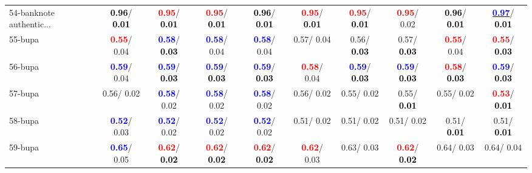 \begin{table}[h]
\begin{center}
{\begin{tabular}{lc|c|c|c|c|c|c|c|c}
54-banknote authentic... & \textcolor{black}{\textbf{  0.96}}/\textcolor{black}{\textbf{  0.01}} & \textcolor{red}{\textbf{  0.95}}/\textcolor{black}{\textbf{  0.01}} & \textcolor{red}{\textbf{  0.95}}/\textcolor{black}{\textbf{  0.01}} & \textcolor{black}{\textbf{  0.96}}/\textcolor{black}{\textbf{  0.01}} & \textcolor{red}{\textbf{  0.95}}/\textcolor{black}{\textbf{  0.01}} & \textcolor{red}{\textbf{  0.95}}/\textcolor{black}{\textbf{  0.01}} & \textcolor{red}{\textbf{  0.95}}/  0.02 & \textcolor{black}{\textbf{  0.96}}/\textcolor{black}{\textbf{  0.01}} & \underline{\textcolor{blue}{\textbf{  0.97}}}/\textcolor{black}{\textbf{  0.01}} \\
55-bupa & \textcolor{red}{\textbf{  0.55}}/  0.04 & \textcolor{blue}{\textbf{  0.58}}/\textcolor{black}{\textbf{  0.03}} & \textcolor{blue}{\textbf{  0.58}}/  0.04 & \textcolor{blue}{\textbf{  0.58}}/  0.04 &   0.57/  0.04 &   0.56/\textcolor{black}{\textbf{  0.03}} &   0.57/\textcolor{black}{\textbf{  0.03}} & \textcolor{red}{\textbf{  0.55}}/  0.04 & \textcolor{red}{\textbf{  0.55}}/\textcolor{black}{\textbf{  0.03}} \\
56-bupa & \textcolor{blue}{\textbf{  0.59}}/  0.04 & \textcolor{blue}{\textbf{  0.59}}/\textcolor{black}{\textbf{  0.03}} & \textcolor{blue}{\textbf{  0.59}}/\textcolor{black}{\textbf{  0.03}} & \textcolor{blue}{\textbf{  0.59}}/\textcolor{black}{\textbf{  0.03}} & \textcolor{red}{\textbf{  0.58}}/  0.04 & \textcolor{blue}{\textbf{  0.59}}/\textcolor{black}{\textbf{  0.03}} & \textcolor{blue}{\textbf{  0.59}}/\textcolor{black}{\textbf{  0.03}} & \textcolor{red}{\textbf{  0.58}}/\textcolor{black}{\textbf{  0.03}} & \textcolor{blue}{\textbf{  0.59}}/\textcolor{black}{\textbf{  0.03}} \\
57-bupa &   0.56/  0.02 & \textcolor{blue}{\textbf{  0.58}}/  0.02 & \textcolor{blue}{\textbf{  0.58}}/  0.02 & \textcolor{blue}{\textbf{  0.58}}/  0.02 &   0.56/  0.02 &   0.55/  0.02 &   0.55/\textcolor{black}{\textbf{  0.01}} &   0.55/  0.02 & \textcolor{red}{\textbf{  0.53}}/\textcolor{black}{\textbf{  0.01}} \\
58-bupa & \textcolor{blue}{\textbf{  0.52}}/  0.03 & \textcolor{blue}{\textbf{  0.52}}/  0.02 & \textcolor{blue}{\textbf{  0.52}}/  0.02 & \textcolor{blue}{\textbf{  0.52}}/  0.02 &   0.51/  0.02 &   0.51/  0.02 &   0.51/  0.02 &   0.51/\textcolor{black}{\textbf{  0.01}} &   0.51/\textcolor{black}{\textbf{  0.01}} \\
59-bupa & \textcolor{blue}{\textbf{  0.65}}/  0.05 & \textcolor{red}{\textbf{  0.62}}/\textcolor{black}{\textbf{  0.02}} & \textcolor{red}{\textbf{  0.62}}/\textcolor{black}{\textbf{  0.02}} & \textcolor{red}{\textbf{  0.62}}/\textcolor{black}{\textbf{  0.02}} & \textcolor{red}{\textbf{  0.62}}/  0.03 &   0.63/  0.03 & \textcolor{red}{\textbf{  0.62}}/\textcolor{black}{\textbf{  0.02}} &   0.64/  0.03 &   0.64/  0.04 \\

\end{tabular}}
\end{center}
\end{table}
